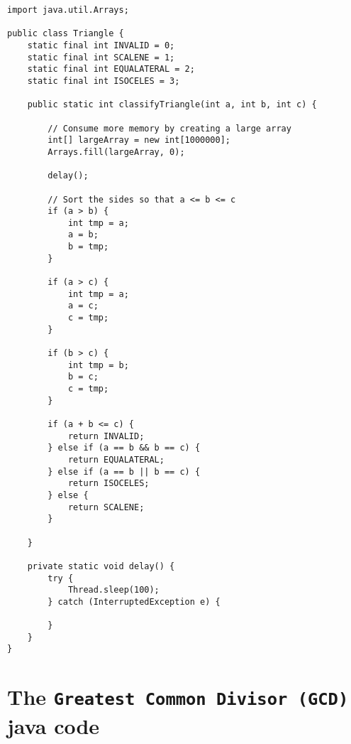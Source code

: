 \begin{lstlisting}
import java.util.Arrays;

public class Triangle {
    static final int INVALID = 0;
    static final int SCALENE = 1;
    static final int EQUALATERAL = 2;
    static final int ISOCELES = 3;

    public static int classifyTriangle(int a, int b, int c) {

        // Consume more memory by creating a large array
        int[] largeArray = new int[1000000];
        Arrays.fill(largeArray, 0);

        delay();

        // Sort the sides so that a <= b <= c
        if (a > b) {
            int tmp = a;
            a = b;
            b = tmp;
        }

        if (a > c) {
            int tmp = a;
            a = c;
            c = tmp;
        }

        if (b > c) {
            int tmp = b;
            b = c;
            c = tmp;
        }

        if (a + b <= c) {
            return INVALID;
        } else if (a == b && b == c) {
            return EQUALATERAL;
        } else if (a == b || b == c) {
            return ISOCELES;
        } else {
            return SCALENE;
        }

    }

    private static void delay() {
        try {
            Thread.sleep(100);
        } catch (InterruptedException e) {

        }
    }
}
\end{lstlisting}

\section{The \texttt{Greatest Common Divisor (GCD)} java code}\label{sec:GCD}

